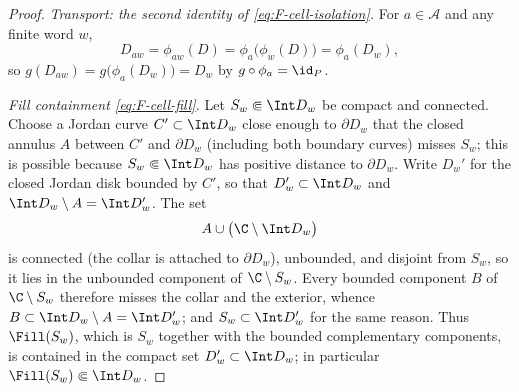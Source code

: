 \begin{proof}
\emph{Transport: the second identity of \eqref{eq:F-cell-isolation}.}
For $a\in\mathcal A$ and any finite word $w$,
\[
D_{aw}=\phi_{aw}(D)=\phi_a\bigl(\phi_w(D)\bigr)=\phi_a(D_w),
\]
so $g(D_{aw})=g\bigl(\phi_a(D_w)\bigr)=D_w$ by $g\circ\phi_a=\id_P$.

\emph{Fill containment \eqref{eq:F-cell-fill}.}
Let $S_w\Subset\Int D_w$ be compact and connected.  Choose a Jordan
curve $C'\subset\Int D_w$ close enough to $\partial D_w$ that the closed
annulus $A$ between $C'$ and $\partial D_w$ (including both boundary
curves) misses $S_w$; this is possible because $S_w\Subset\Int D_w$ has
positive distance to $\partial D_w$.  Write $D_w'$ for the closed Jordan
disk bounded by $C'$, so that $D_w'\subset\Int D_w$ and
$\Int D_w\setminus A=\Int D_w'$.  The set
\[
A\cup\bigl(\C\setminus\Int D_w\bigr)
\]
is connected (the collar is attached to $\partial D_w$), unbounded, and
disjoint from $S_w$, so it lies in the unbounded component of
$\C\setminus S_w$.  Every bounded component $B$ of $\C\setminus S_w$
therefore misses the collar and the exterior, whence
$B\subset\Int D_w\setminus A=\Int D_w'$; and $S_w\subset\Int D_w'$ for
the same reason.  Thus $\Fill(S_w)$, which is $S_w$ together with the
bounded complementary components, is contained in the compact set
$D_w'\subset\Int D_w$; in particular $\Fill(S_w)\Subset\Int D_w$.
\end{proof}

